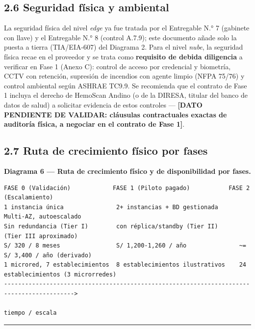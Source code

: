 \documentclass[11pt,a4paper]{article}
\begin{document}
\subsection{2.6 Seguridad física y ambiental}\label{seguridad-fuxedsica-y-ambiental}

La seguridad física del nivel \emph{edge} ya fue tratada por el Entregable N.° 7 (gabinete con llave) y el Entregable N.° 8 (control A.7.9); este documento añade solo la puesta a tierra (TIA/EIA-607) del Diagrama 2. Para el nivel \emph{nube}, la seguridad física recae en el proveedor y se trata como \textbf{requisito de debida diligencia} a verificar en Fase 1 (Anexo C): control de acceso por credencial y biometría, CCTV con retención, supresión de incendios con agente limpio (NFPA 75/76) y control ambiental según ASHRAE TC9.9. Se recomienda que el contrato de Fase 1 incluya el derecho de HemoScan Andino (o de la DIRESA, titular del banco de datos de salud) a solicitar evidencia de estos controles --- \textbf{{[}DATO PENDIENTE DE VALIDAR: cláusulas contractuales exactas de auditoría física, a negociar en el contrato de Fase 1{]}}.

\subsection{2.7 Ruta de crecimiento físico por fases}\label{ruta-de-crecimiento-fuxedsico-por-fases}

\textbf{Diagrama 6 --- Ruta de crecimiento físico y de disponibilidad por fases.}

\begin{samepage}\begin{verbatim}
FASE 0 (Validación)            FASE 1 (Piloto pagado)           FASE 2 (Escalamiento)
1 instancia única               2+ instancias + BD gestionada     Multi-AZ, autoescalado
Sin redundancia (Tier I)        con réplica/standby (Tier II)     (Tier III aproximado)
S/ 320 / 8 meses                S/ 1,200-1,260 / año               ~= S/ 3,400 / año (derivado)
1 microred, 7 establecimientos  8 establecimientos ilustrativos    24 establecimientos (3 microrredes)
------------------------------------------------------------------------------------------>
                                                                              tiempo / escala
\end{verbatim}\end{samepage}

\begin{center}\rule{0.5\linewidth}{0.5pt}\end{center}
\end{document}
